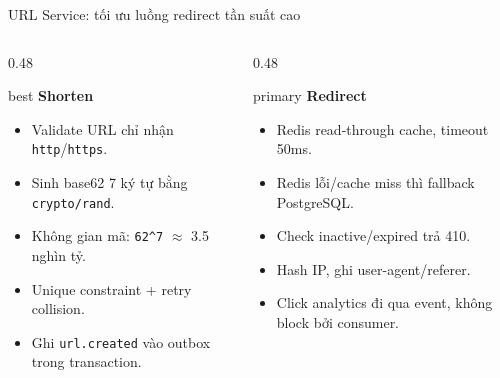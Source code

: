 \documentclass[aspectratio=169]{beamer}
\begin{document}
\begin{frame}{URL Service: tối ưu luồng redirect tần suất cao}
    \begin{columns}[T,onlytextwidth]
        \begin{column}{0.48\textwidth}
            \begin{claimbox}{best}
                \textbf{Shorten}
                \begin{itemize}\scriptsize
                    \item Validate URL chỉ nhận \texttt{http}/\texttt{https}.
                    \item Sinh base62 7 ký tự bằng \texttt{crypto/rand}.
                    \item Không gian mã: \texttt{62\^{}7} $\approx$ 3.5 nghìn tỷ.
                    \item Unique constraint + retry collision.
                    \item Ghi \texttt{url.created} vào outbox trong transaction.
                \end{itemize}
            \end{claimbox}
        \end{column}
        \begin{column}{0.48\textwidth}
            \begin{claimbox}{primary}
                \textbf{Redirect}
                \begin{itemize}\small
                    \item Redis read-through cache, timeout 50ms.
                    \item Redis lỗi/cache miss thì fallback PostgreSQL.
                    \item Check inactive/expired trả 410.
                    \item Hash IP, ghi user-agent/referer.
                    \item Click analytics đi qua event, không block bởi consumer.
                \end{itemize}
            \end{claimbox}
        \end{column}
    \end{columns}
\end{frame}
\end{document}
